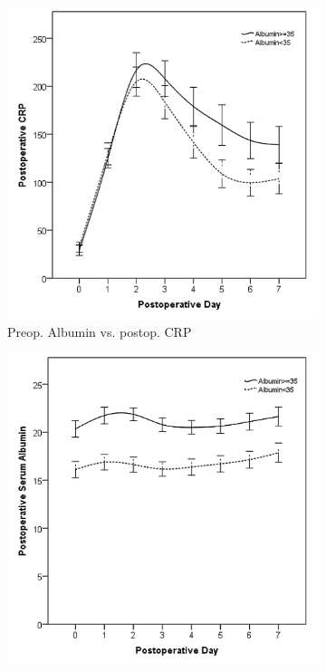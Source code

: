
\begin{figure}[p]
	\caption{Relationship between preoperative Albumin levels and postoperative inflammatory markers in the first week after pancreaticoduodenectomy.}
	\label{fig:sirs_alb}
	\centering
	\begin{subfigure}{0.48\textwidth}
		\centering
		\includegraphics[width=\textwidth]{Figures/sirs_alb_crp}
		\caption{Preop. Albumin vs. postop. CRP}
		\label{fig:sirs_alb_crp}
	\end{subfigure}
	\hfill
	\begin{subfigure}{0.48\textwidth}
		\centering
		\includegraphics[width=\textwidth]{Figures/sirs_alb_alb}

\end{subfigure}
\end{figure}
